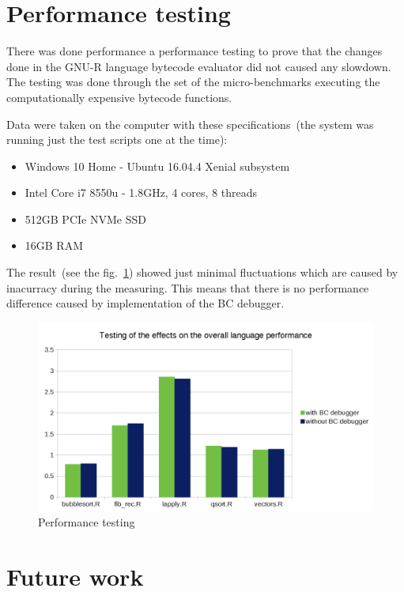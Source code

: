 \documentclass[thesis=M,english]{FITthesis}[2018/10/20]
\begin{document}
{\section{Performance testing}\label{performance-testing}

There was done performance a performance testing to prove that the changes done in the GNU-R language bytecode evaluator did not caused any slowdown. The testing was done through the set of the micro-benchmarks executing the computationally expensive bytecode functions. 

Data were taken on the computer with these specifications~(the system was running just the test scripts one at the time):

\begin{itemize}
	\item Windows 10 Home - Ubuntu 16.04.4 Xenial subsystem
	\item Intel Core i7 8550u - 1.8GHz, 4 cores, 8 threads
	\item 512GB PCIe NVMe SSD
	\item 16GB RAM
\end{itemize}

The result~(see the fig.~\ref{fig:performance-testing}) showed just minimal fluctuations which are caused by inacurracy during the measuring. This means that there is no performance difference caused by implementation of the BC debugger.

\begin{figure}[H]\centering
	\includegraphics[width=\textwidth]{performance-testing}
	\caption{Performance testing}\label{fig:performance-testing}
\end{figure}

\section{Future work}

}
\end{document}
